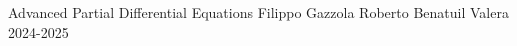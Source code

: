 \documentclass{classNotes}
\def\author{Roberto Benatuil Valera}
\def\prof{Filippo Gazzola}
\def\course{Advanced Partial Differential Equations}
\def\academicyear{2024-2025}
\begin{document}

\frontpage
    {\course}
    {\prof}
    {\author}
    {\academicyear}

\tableofcontents


\end{document}
